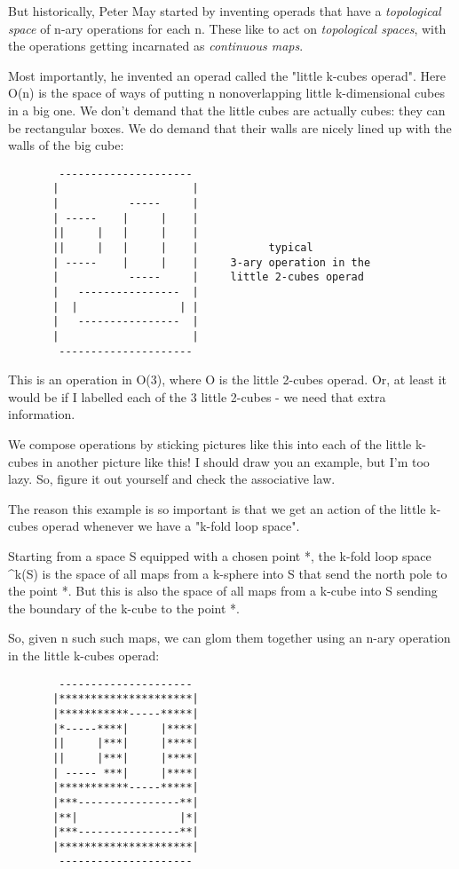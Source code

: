But historically, Peter May started by inventing operads that have 
a \emph{topological space} of n-ary operations for each n.  These like 
to act on \emph{topological spaces}, with the operations getting 
incarnated as \emph{continuous maps}.     

Most importantly, he invented an operad called the "little k-cubes 
operad".  Here O(n) is the space of ways of putting n nonoverlapping
little k-dimensional cubes in a big one.  We don't demand that
the little cubes are actually cubes: they can be rectangular
boxes.  We do demand that their walls are nicely lined up with 
the walls of the big cube:


\begin{verbatim}
        ---------------------
       |                     |
       |           -----     |
       | -----    |     |    | 
       ||     |   |     |    |
       ||     |   |     |    |           typical  
       | -----    |     |    |     3-ary operation in the       
       |           -----     |     little 2-cubes operad
       |   ----------------  |
       |  |                | |
       |   ----------------  |
       |                     |
        ---------------------

\end{verbatim}
    
This is an operation in O(3), where O is the little 2-cubes
operad.  Or, at least it would be if I labelled each of the 3 
little 2-cubes - we need that extra information.  

We compose operations by sticking pictures like this into 
each of the little k-cubes in another picture like this!  
I should draw you an example, but I'm too lazy.  So, figure
it out yourself and check the associative law.

The reason this example is so important is that we get an action
of the little k-cubes operad whenever we have a "k-fold loop 
space".  

Starting from a space S equipped with a chosen point *, the 
k-fold loop space \Omega ^{k}(S) is the space of all maps from
a k-sphere into S that send the north pole to the point *.  But
this is also the space of all maps from a k-cube into S sending 
the boundary of the k-cube to the point *.  

So, given n such such maps, we can glom them together using an 
n-ary operation in the little k-cubes operad:

\begin{verbatim}
        ---------------------
       |*********************|
       |***********-----*****|
       |*-----****|     |****| 
       ||     |***|     |****|
       ||     |***|     |****|
       | ----- ***|     |****|
       |***********-----*****|
       |***----------------**|
       |**|                |*|
       |***----------------**|
       |*********************|
        ---------------------
\end{verbatim}
    

